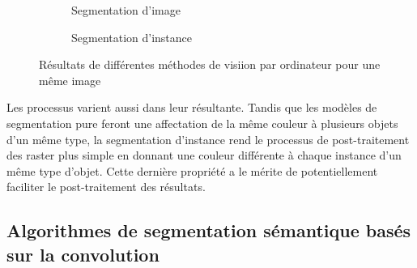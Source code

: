 \begin{figure}[h]
          \begin{subfigure}{0.4\textwidth}
            \centering
            \caption{Segmentation d'image}
          \end{subfigure}
          \begin{subfigure}{0.4\textwidth}
            \centering
            \caption{Segmentation d'instance}
          \end{subfigure}
          \caption{Résultats de différentes méthodes de visiion par ordinateur pour une même image}
          \label{fig:computer_vision_problems}
      \end{figure}
  Les processus varient aussi dans leur résultante. Tandis que les modèles de segmentation pure feront une affectation de la même couleur à plusieurs objets d'un même type, la segmentation d'instance rend le processus de post-traitement des raster plus simple en donnant une couleur différente à chaque instance d'un même type d'objet. Cette dernière propriété a le mérite de potentiellement faciliter le post-traitement des résultats.
  \subsection{Algorithmes de segmentation sémantique basés sur la convolution}


